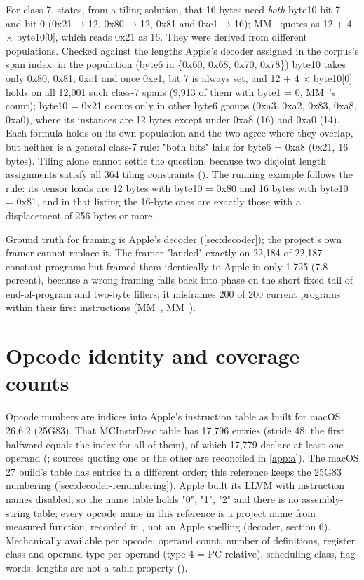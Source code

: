 For class 7,  states, from a tiling solution, that 16 bytes need \emph{both} byte10
bit 7 and bit 0 (0x21 → 12, 0x80 → 12, 0x81 and 0xc1 → 16); MM~ quotes  as 12 + 4 × byte10{[}0{]}, which
reads 0x21 as 16. They were derived from different populations. Checked against the lengths Apple's decoder assigned in the corpus's span
index: in the  population (byte6 in \{0x60, 0x68, 0x70, 0x78\}) byte10 takes only 0x80, 0x81, 0xc1 and once
0xe1, bit 7 is always set, and 12 + 4 × byte10{[}0{]} holds on all 12,001 such class-7 spans (9,913 of them with byte1 = 0,
MM~'s count); byte10 = 0x21 occurs only in other byte6 groups (0xa3, 0xa2, 0x83, 0xa8, 0xa0), where its instances are
12 bytes except under 0xa8 (16) and 0xa0 (14). Each formula holds on its own population and the two agree where they
overlap, but neither is a general class-7 rule: "both bits" fails for byte6 = 0xa8 (0x21, 16 bytes). Tiling alone cannot settle the question,
because two disjoint length assignments satisfy all 364 tiling constraints (). The running
example follows the  rule: its tensor loads are 12 bytes with byte10 = 0x80 and 16 bytes with byte10 = 0x81, and in that
listing the 16-byte ones are exactly those with a displacement of 256 bytes or more.

Ground truth for framing is Apple's decoder (\cref{sec:decoder}); the project's own framer cannot replace it. The framer "landed" exactly on
22,184 of 22,187 constant programs but framed them identically to Apple in only 1,725 (7.8 percent), because a wrong
framing falls back into phase on the short fixed tail of end-of-program and two-byte fillers; it misframes 200 of 200
current programs within their first instructions (MM~, MM~).

\section{Opcode identity and coverage counts}\label{sec:opcode-identity-counts}

Opcode numbers are indices into Apple's instruction table as built for macOS 26.6.2 (25G83). That MCInstrDesc table has
17,796 entries (stride 48; the first halfword equals the index for all of them), of which 17,779 declare at least one
operand (; sources quoting one or the other are reconciled in \cref{app:a}). The macOS 27
build's table has  entries in a different order; this reference keeps the 25G83 numbering
(\cref{sec:decoder-renumbering}). Apple built its LLVM with instruction names disabled, so the name table holds
"0", "1", "2" and there is no assembly-string table; every opcode name in this reference is a project name from measured
function, recorded in , not an Apple spelling (decoder,  section 6).
Mechanically available per opcode: operand count, number of definitions, register class and operand type per operand
(type 4 = PC-relative), scheduling class, flag words; lengths are not a table property ().

